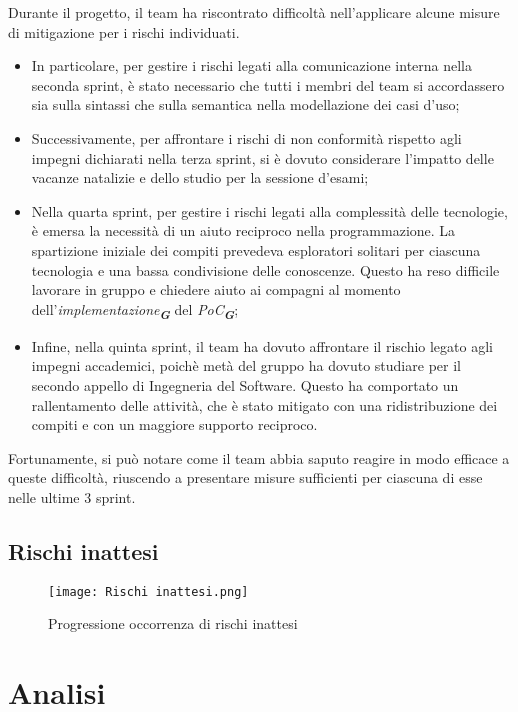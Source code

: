 Durante il progetto, il team ha riscontrato difficoltà nell'applicare alcune misure di mitigazione
per i rischi individuati.
\begin{itemize}
    \item In particolare, per gestire i rischi legati alla comunicazione interna nella seconda sprint, è stato necessario che 
    tutti i membri del team si accordassero sia sulla sintassi che sulla semantica nella modellazione dei casi d'uso;
    \item Successivamente, per affrontare i rischi di non conformità rispetto agli impegni dichiarati nella terza sprint, si è 
    dovuto considerare l'impatto delle vacanze natalizie e dello studio per la sessione d'esami;
    \item Nella quarta sprint, per gestire i rischi legati alla complessità delle tecnologie, è emersa la necessità di 
    un aiuto reciproco nella programmazione. La spartizione iniziale dei compiti prevedeva esploratori solitari per ciascuna 
    tecnologia e una bassa condivisione delle conoscenze. Questo ha reso difficile lavorare in gruppo e chiedere aiuto ai compagni 
    al momento dell'\emph{implementazione}\textsubscript{\textbf{\textit{G}}} del \emph{PoC}\textsubscript{\textbf{\textit{G}}};
    \item Infine, nella quinta sprint, il team ha dovuto affrontare il rischio legato agli impegni accademici, poichè metà del gruppo ha dovuto studiare per il secondo appello di Ingegneria del Software. Questo ha comportato un rallentamento delle attività, che è stato mitigato con una ridistribuzione dei compiti e con un maggiore supporto reciproco.
\end{itemize}
Fortunamente, si può notare come il team abbia saputo reagire in modo efficace a queste difficoltà, riuscendo a presentare misure sufficienti per ciascuna di esse nelle ultime 3 sprint.

\newpage

\subsection{Rischi inattesi}
\label{subsec:Rischi inattesi}

\begin{figure}[h] 
    \centering
    \texttt{[image: Rischi inattesi.png]}
    \caption{Progressione occorrenza di rischi inattesi} 
    \label{fig: Rischi inattesi}
\end{figure}

\section*{Analisi}

